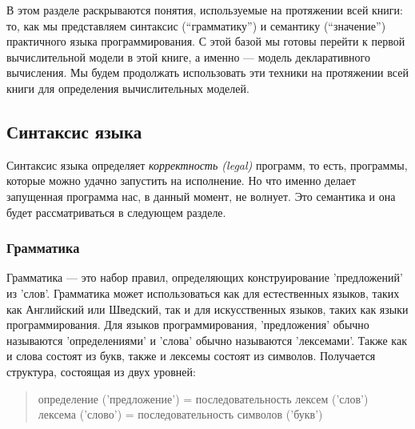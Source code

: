 В этом разделе раскрываются понятия, используемые на протяжении всей книги: то, как мы представляем синтаксис (``грамматику'') и семантику (``значение'') практичного языка программирования. С этой базой мы готовы перейти к первой вычислительной модели в этой книге, а именно --- модель декларативного вычисления. Мы будем продолжать использовать эти техники на протяжении всей книги для определения вычислительных моделей.

\subsection{Синтаксис языка}

Синтаксис языка определяет \emph{корректность (legal)} программ, то есть, программы, которые можно удачно запустить на исполнение. Но что именно делает запущенная программа нас, в данный момент, не волнует. Это семантика и она будет рассматриваться в следующем разделе.

\subsubsection{Грамматика}

Грамматика --- это набор правил, определяющих конструирование 'предложений' из 'слов'. Грамматика может использоваться как для естественных языков, таких как Английский или Шведский, так и для искусственных языков, таких как языки программирования. Для языков программирования, 'предложения' обычно называются 'определениями' и 'слова' обычно называются 'лексемами'. Также как и слова состоят из букв, также и лексемы состоят из символов. Получается структура, состоящая из двух уровней:

\begin{quote}
определение ('предложение') = последовательность лексем ('слов') \\
лексема ('слово') = последовательность символов ('букв')
\end{quote}

